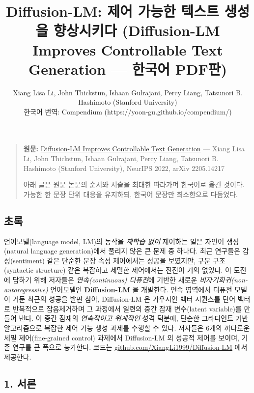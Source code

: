 \documentclass[
]{article}
\title{Diffusion-LM: 제어 가능한 텍스트 생성을 향상시키다 (Diffusion-LM Improves Controllable Text Generation — 한국어 PDF판)}
\author{Xiang Lisa Li, John Thickstun, Ishaan Gulrajani, Percy Liang, Tatsunori B. Hashimoto (Stanford University)\\한국어 번역: Compendium (https://yoon-gu.github.io/compendium/)}
\date{}
\begin{document}
\maketitle

{
\hypersetup{linkcolor=}
\setcounter{tocdepth}{3}
\tableofcontents
}
\begin{quote}
\textbf{원문:} \href{https://arxiv.org/abs/2205.14217}{Diffusion-LM
Improves Controllable Text Generation} --- Xiang Lisa Li, John
Thickstun, Ishaan Gulrajani, Percy Liang, Tatsunori B. Hashimoto
(Stanford University), NeurIPS 2022, arXiv 2205.14217

아래 글은 원문 논문의 순서와 서술을 최대한 따라가며 한국어로 옮긴
것이다. 가능한 한 문장 단위 대응을 유지하되, 한국어 문장만 최소한으로
다듬었다.
\end{quote}

\hypertarget{uxcd08uxb85d}{%
\subsection{초록}\label{uxcd08uxb85d}}

언어모델(language model, LM)의 동작을 \emph{재학습 없이} 제어하는 일은
자연어 생성(natural language generation)에서 풀리지 않은 큰 문제 중
하나다. 최근 연구들은 감성(sentiment) 같은 단순한 문장 속성 제어에서는
성공을 보였지만, 구문 구조(syntactic structure) 같은 복잡하고 세밀한
제어에서는 진전이 거의 없었다. 이 도전에 답하기 위해 저자들은
\emph{연속(continuous) 디퓨전}에 기반한 새로운
\emph{비자기회귀(non-autoregressive)} 언어모델인 \textbf{Diffusion-LM}
을 개발한다. 연속 영역에서 디퓨전 모델이 거둔 최근의 성공을 발판 삼아,
Diffusion-LM 은 가우시안 벡터 시퀀스를 단어 벡터로 반복적으로
잡음제거하며 그 과정에서 일련의 중간 잠재 변수(latent variable)를 만들어
낸다. 이 중간 잠재의 \emph{연속적이고 위계적인} 성격 덕분에, 단순한
그라디언트 기반 알고리즘으로 복잡한 제어 가능 생성 과제를 수행할 수
있다. 저자들은 6개의 까다로운 세밀 제어(fine-grained control) 과제에서
Diffusion-LM 의 성공적 제어를 보이며, 기존 연구를 큰 폭으로 능가한다.
코드는
\href{https://github.com/XiangLi1999/Diffusion-LM}{github.com/XiangLi1999/Diffusion-LM}
에서 제공한다.

\hypertarget{uxc11cuxb860}{%
\subsection{1. 서론}\label{uxc11cuxb860}}
\end{document}
